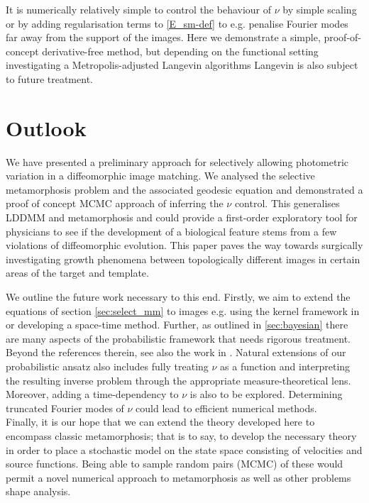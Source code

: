 \documentclass[runningheads]{llncs}
\begin{document}
It is numerically relatively simple to control the behaviour of $\nu$ by simple
scaling or by adding regularisation terms to \eqref{E_sm-def} to e.g. penalise
Fourier modes far away from the support of the images. Here we demonstrate a
simple, proof-of-concept derivative-free method, but depending on the functional
setting investigating a Metropolis-adjusted Langevin algorithms Langevin is also
subject to future treatment.

\section{Outlook}\label{sec:outlook}

We have presented a preliminary approach for selectively allowing photometric
variation in a diffeomorphic image matching. We analysed the selective
metamorphosis problem and the associated geodesic equation and demonstrated a
proof of concept MCMC approach of inferring the $\nu$ control. This generalises
LDDMM and metamorphosis and could provide a first-order exploratory tool for
physicians to see if the development of a biological feature stems from a few
violations of diffeomorphic evolution. This paper paves the way towards
surgically investigating growth phenomena between topologically different images
in certain areas of the target and template. 

We outline the future work necessary to this end. Firstly, we aim to extend the
equations of section \ref{sec:select_mm} to images e.g. using the kernel
framework in \cite{richardson2016metamorphosis} or developing a space-time
method. Further, as outlined in \ref{sec:bayesian} there are many aspects of the
probabilistic framework that needs rigorous treatment. Beyond the references
therein, see also the work in \cite{dashti2013map}. Natural extensions of our
probabilistic ansatz also includes fully treating $\nu$ as a function and
interpreting the resulting inverse problem through the appropriate
measure-theoretical lens. Moreover, adding a time-dependency to $\nu$ is also to
be explored. Determining truncated Fourier modes of $\nu$ could lead to
efficient numerical methods.\\

Finally, it is our hope that we can extend the theory developed here to
encompass classic metamorphosis; that is to say, to develop the necessary theory
in order to place a stochastic model on the state space consisting of velocities
and source functions. Being able to sample random pairs (MCMC) of these would
permit a novel numerical approach to metamorphosis as well as other problems
shape analysis.
\end{document}
